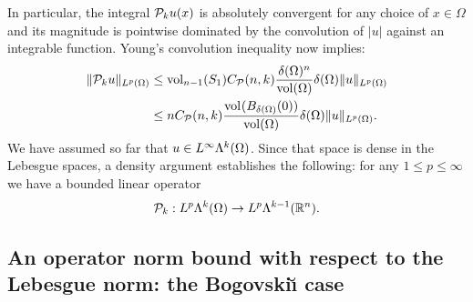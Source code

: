 \documentclass[10pt,a4paper]{article}
\begin{document}
In particular, the integral ${\mathcal P}_{k} u(x)$ is absolutely convergent for any choice of $x \in \Omega$
and its magnitude is pointwise dominated by the convolution of $|u|$ against an integrable function.
Young's convolution inequality now implies: 
\begin{align*}
    \| {\mathcal P}_{k} u \|_{L^{p}(\Omega)}
    &
    \leq 
    \operatorname{vol}_{n-1}(S_1) C_{{\mathcal P}}(n,k) \frac{ {\delta}(\Omega)^{n} }{\operatorname{vol}(\Omega)} 
    {\delta}(\Omega)
    \| u \|_{L^{p}(\Omega)}
    \\&
    \leq 
    n C_{{\mathcal P}}(n,k) \frac{ \operatorname{vol}_{}(B_{{\delta}(\Omega)}(0)) }{\operatorname{vol}(\Omega)} 
    {\delta}(\Omega)
    \| u \|_{L^{p}(\Omega)}
    .
\end{align*}
We have assumed so far that $u \in L^{\infty}\Lambda^{k}(\Omega)$. 
Since that space is dense in the Lebesgue spaces, a density argument establishes the following: 
for any $1 \leq p \leq \infty$ we have a bounded linear operator 
\begin{gather*}
    {\mathcal P}_{k} : L^{p}\Lambda^{k}(\Omega) \rightarrow L^{p}\Lambda^{k-1}({\mathbb R}^n).
\end{gather*}
% 


\subsection{An operator norm bound with respect to the Lebesgue norm: the Bogovski\u{\i} case}
\end{document}
